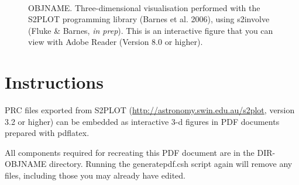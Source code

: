 \documentclass{article}
\begin{document}
\begin{figure}
\begin{center}
  \vspace{0.12in}
  \\
\end{center}
\caption{OBJNAME. Three-dimensional visualisation performed with the 
{\sc S2PLOT} programming library (Barnes et al. 2006), using {\sc s2involve} 
(Fluke \& Barnes, {\em in prep}).  This is an interactive figure that you can 
view with Adobe Reader (Version 8.0 or higher).
}
\label{caption:fig1}
\end{figure}

\newpage
\section*{Instructions}
PRC files exported from S2PLOT (\url{http://astronomy.swin.edu.au/s2plot}, 
version 3.2 or higher) can be embedded as interactive 3-d figures in PDF documents 
prepared with {\sc pdflatex}.  


All components required for recreating this PDF document are in the DIR-OBJNAME
directory.  Running the {\sc generatepdf.csh} script again will remove any files, including
those you may already have edited. 
\end{document}
